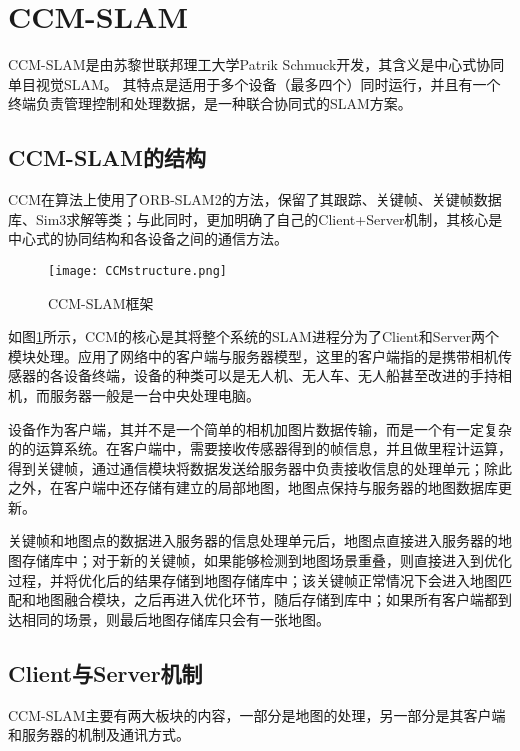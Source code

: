 \section{CCM-SLAM}

CCM-SLAM是由苏黎世联邦理工大学Patrik Schmuck开发，其含义是中心式协同单目视觉SLAM。
其特点是适用于多个设备（最多四个）同时运行，并且有一个终端负责管理控制和处理数据，是一种联合协同式的SLAM方案。

\subsection{CCM-SLAM的结构} \label{3.3.1}

CCM在算法上使用了ORB-SLAM2的方法，保留了其跟踪、关键帧、关键帧数据库、Sim3求解等类；与此同时，更加明确了自己的Client+Server机制，其核心是中心式的协同结构和各设备之间的通信方法。
~\\
\begin{figure}[!ht]
	\centering
	\texttt{[image: CCMstructure.png]}
	\caption{CCM-SLAM框架}
	\label{fig11}
\end{figure}

如图\ref{fig11}所示，CCM的核心是其将整个系统的SLAM进程分为了Client和Server两个模块处理。应用了网络中的客户端与服务器模型，这里的客户端指的是携带相机传感器的各设备终端，设备的种类可以是无人机、无人车、无人船甚至改进的手持相机，而服务器一般是一台中央处理电脑。

设备作为客户端，其并不是一个简单的相机加图片数据传输，而是一个有一定复杂的的运算系统。在客户端中，需要接收传感器得到的帧信息，并且做里程计运算，得到关键帧，通过通信模块将数据发送给服务器中负责接收信息的处理单元；除此之外，在客户端中还存储有建立的局部地图，地图点保持与服务器的地图数据库更新。

关键帧和地图点的数据进入服务器的信息处理单元后，地图点直接进入服务器的地图存储库中；对于新的关键帧，如果能够检测到地图场景重叠，则直接进入到优化过程，并将优化后的结果存储到地图存储库中；该关键帧正常情况下会进入地图匹配和地图融合模块，之后再进入优化环节，随后存储到库中；如果所有客户端都到达相同的场景，则最后地图存储库只会有一张地图\cite{schmuck2019ccm}。

\subsection{Client与Server机制} \label{3.3.2}

CCM-SLAM主要有两大板块的内容，一部分是地图的处理，另一部分是其客户端和服务器的机制及通讯方式。

